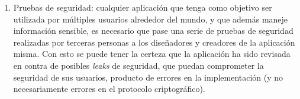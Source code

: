 \begin{enumerate}
    \item Pruebas de seguridad: cualquier aplicación que tenga como objetivo ser 
    utilizada por múltiples usuarios alrededor del mundo, y que además maneje 
    información sensible, es necesario que pase una serie de pruebas de seguridad 
    realizadas por terceras personas a los diseñadores y creadores de la aplicación 
    misma. Con esto se puede tener la certeza que la aplicación ha sido revisada en 
    contra de posibles \emph{leaks} de seguridad, que puedan comprometer la seguridad 
    de sus usuarios, producto de errores en la implementación (y no necesariamente 
    errores en el protocolo criptográfico).
\end{enumerate}
